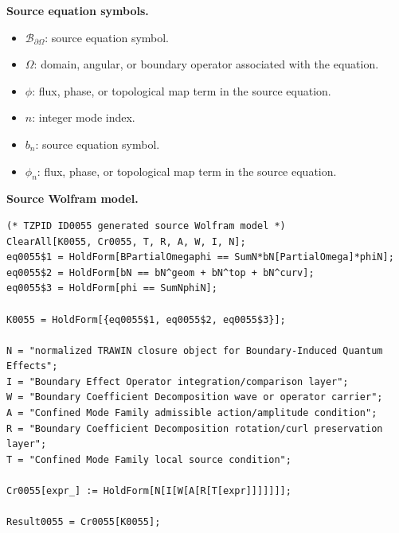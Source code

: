 \begin{minipage}[t]{0.49\linewidth}
\begingroup
\small
\raggedright
\textbf{Source equation symbols.}\par
\begin{itemize}[leftmargin=1.35em,itemsep=1pt,topsep=1pt,parsep=0pt]
    \item $\mathcal{B}_{\partial\Omega}$: source equation symbol.
    \item $\Omega$: domain, angular, or boundary operator associated with the equation.
    \item $\phi$: flux, phase, or topological map term in the source equation.
    \item $n$: integer mode index.
    \item $b_{n}$: source equation symbol.
    \item $\phi_{n}$: flux, phase, or topological map term in the source equation.
\end{itemize}
\endgroup
\end{minipage}\hfill
\begin{minipage}[t]{0.47\linewidth}
\begingroup
\scriptsize
\raggedright
\textbf{Source Wolfram model.}\par
\begin{Verbatim}[fontsize=\tiny,breaklines=true,breakanywhere=true]
(* TZPID ID0055 generated source Wolfram model *)
ClearAll[K0055, Cr0055, T, R, A, W, I, N];
eq0055$1 = HoldForm[BPartialOmegaphi == SumN*bN[PartialOmega]*phiN];
eq0055$2 = HoldForm[bN == bN^geom + bN^top + bN^curv];
eq0055$3 = HoldForm[phi == SumNphiN];

K0055 = HoldForm[{eq0055$1, eq0055$2, eq0055$3}];

N = "normalized TRAWIN closure object for Boundary-Induced Quantum Effects";
I = "Boundary Effect Operator integration/comparison layer";
W = "Boundary Coefficient Decomposition wave or operator carrier";
A = "Confined Mode Family admissible action/amplitude condition";
R = "Boundary Coefficient Decomposition rotation/curl preservation layer";
T = "Confined Mode Family local source condition";

Cr0055[expr_] := HoldForm[N[I[W[A[R[T[expr]]]]]]];

Result0055 = Cr0055[K0055];
\end{Verbatim}
\endgroup
\end{minipage}


